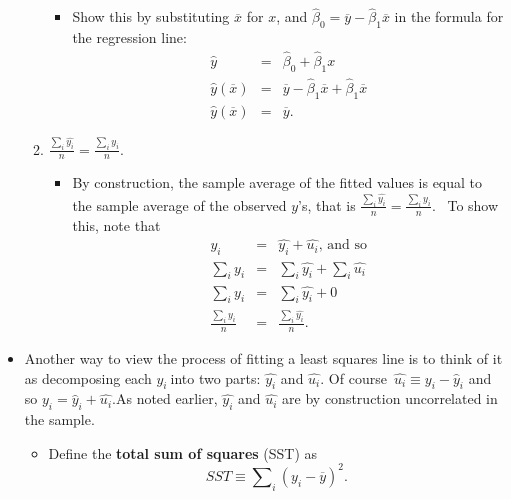 \documentclass[11pt]{article}
\begin{document}
\begin{itemize}
\begin{enumerate}
\begin{itemize}
\item Show this by substituting $\overline{x}$ for $x$, and $\widehat{\beta }%
_{0}=\overline{y}-\widehat{\beta }_{1}\overline{x}$ in the formula for the
regression line:%
\begin{eqnarray*}
\widehat{y} &=&\widehat{\beta }_{0}+\widehat{\beta }_{1}x \\
\widehat{y}\left( \overline{x}\right) &=&\overline{y}-\widehat{\beta }_{1}%
\overline{x}+\widehat{\beta }_{1}\overline{x} \\
\widehat{y}\left( \overline{x}\right) &=&\overline{y}.
\end{eqnarray*}
\end{itemize}

\item $\frac{\sum\nolimits_{i}\widehat{y_{i}}}{n}=\frac{\sum%
\nolimits_{i}y_{i}}{n}.$

\begin{itemize}
\item By construction, the sample average of the fitted values is equal to
the sample average of the observed $y$'s, that is $\frac{\sum\nolimits_{i}%
\widehat{y_{i}}}{n}=\frac{\sum\nolimits_{i}y_{i}}{n}.$ \ To show this, note
that%
\begin{eqnarray*}
y_{i} &=&\widehat{y_{i}}+\widehat{u_{i}}\text{, and so} \\
\sum\nolimits_{i}y_{i} &=&\sum\nolimits_{i}\widehat{y_{i}}+\sum\nolimits_{i}%
\widehat{u_{i}} \\
\sum\nolimits_{i}y_{i} &=&\sum\nolimits_{i}\widehat{y_{i}}+0 \\
\frac{\sum\nolimits_{i}y_{i}}{n} &=&\frac{\sum\nolimits_{i}\widehat{y_{i}}}{n%
}.
\end{eqnarray*}
\end{itemize}
\end{enumerate}

\item Another way to view the process of fitting a least squares line is to
think of it as decomposing each $y_{i}\ $into two parts: $\widehat{y_{i}}$
and $\widehat{u_{i}}.$ Of course\ $\widehat{u_{i}}\equiv y_{i}-\widehat{y}%
_{i}$ and so $y_{i}=\widehat{y}_{i}+\widehat{u_{i}}.$As noted earlier, $%
\widehat{y_{i}}$ and $\widehat{u_{i}}$ are by construction uncorrelated in
the sample.

\begin{itemize}
\item Define the \textbf{total sum of squares} (SST) as%
\begin{equation*}
SST\equiv \sum\nolimits_{i}\left( y_{i}-\overline{y}\right) ^{2}.
\end{equation*}


\end{itemize}
\end{itemize}
\end{document}
